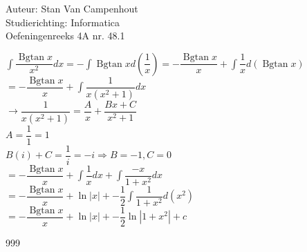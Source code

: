 \documentclass[a4paper]{article}
\begin{document}
  
\noindent \large Auteur: Stan Van Campenhout \\
\noindent \large Studierichting:  Informatica\\
\noindent \large Oefeningenreeks 4A nr. 48.1\\

\medskip

\normalsize

$ \displaystyle\int\dfrac{\operatorname{Bgtan}x}{x^2}dx = -\displaystyle\int\operatorname{Bgtan}xd\left(\dfrac{1}{x}\right)
= -\dfrac{\operatorname{Bgtan}x}{x}+\displaystyle\int\dfrac{1}{x}d\left(\operatorname{Bgtan}x\right) $\\

$ = -\dfrac{\operatorname{Bgtan}x}{x}+\displaystyle\int\dfrac{1}{x\left(x^2+1\right)} dx $\\

$ \rightarrow \dfrac{1}{x\left(x^2+1\right)} = \dfrac{A}{x} + \dfrac{Bx+C}{x^2+1} $\\

$ A = \dfrac{1}{1} = 1 $\\

$ B\left(i\right) + C = \dfrac{1}{i} = -i \Rightarrow B = -1, C = 0 $\\

$ = -\dfrac{\operatorname{Bgtan}x}{x}+\displaystyle\int\dfrac{1}{x}dx + \displaystyle\int\dfrac{-x}{1+x^2}dx $\\

$ = -\dfrac{\operatorname{Bgtan}x}{x}+ \ln|x| + -\dfrac{1}{2}\displaystyle\int\dfrac{1}{1+x^2}d\left(x^2\right) $\\

$ = -\dfrac{\operatorname{Bgtan}x}{x}+\ln|x| + -\dfrac{1}{2}\ln|1+x^2| +c$\\

\begin{thebibliography}{999}
\end{thebibliography}
\end{document}
